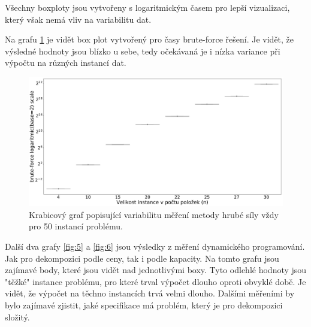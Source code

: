 \documentclass[11pt]{article}
\begin{document}
Všechny boxploty jsou vytvořeny s logaritmickým časem pro lepší vizualizaci, který však nemá vliv na variabilitu dat.

Na grafu \ref{fig:4} je vidět box plot vytvořený pro časy brute-force řešení. Je vidět, že výsledné hodnoty jsou blízko u sebe, tedy očekávaná je i nízka variance při výpočtu na různých instancí dat. 

\begin{figure}[h]\centering
	\includegraphics[scale=0.2]{img/boxB}
 	\caption[2]{Krabicový graf popisující variabilitu měření metody hrubé síly vždy pro 50 instancí problému.}\label{fig:4}
 \end{figure} 		

Další dva grafy \ref{fig:5} a \ref{fig:6} jsou výsledky z měření dynamického programování. Jak pro dekompozici podle ceny, tak i podle kapacity. Na tomto grafu jsou zajímavé body, které jsou vidět nad jednotlivými boxy. Tyto odlehlé hodnoty jsou "těžké" instance problému, pro které trval výpočet dlouho oproti obvyklé době. Je vidět, že výpočet na těchno instancích trvá velmi dlouho. Dalšími měřeními by bylo zajímavé zjistit, jaké specifikace má problém, který je pro dekompozici složitý.
\end{document}
